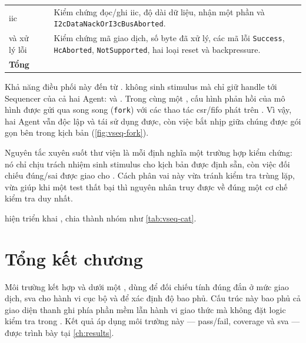 \begin{table}[!htbp]
\begin{tabular}{L{3.0cm} C{1.6cm} L{8.5cm}}
		\gls{iic}                          & \IicVseqCount{}               & Kiểm chứng đọc/ghi \gls{iic}, độ dài dữ liệu, nhận một phần và \texttt{I2cDataNackOr\allowbreak I3cBusAborted}.                                              \\
		\ResponseDescriptor{} và xử lý lỗi & \ResponseVseqCount{}          & Kiểm chứng mã giao dịch, số byte đã xử lý, các mã lỗi \texttt{Success}, \texttt{HcAborted}, \texttt{NotSupported}, hai loại reset và backpressure.         \\
		\midrule
		\textbf{Tổng}                      & \textbf{\RunnableVseqCount{}}                                                                                                                                                                \\
		\bottomrule
	\end{tabular}
\end{table}

Khả năng điều phối này đến từ \VirtualSequencer{}. \VirtualSequencer{} không sinh stimulus mà
chỉ giữ handle tới Sequencer của cả hai Agent: \RegisterAgent{} và \IThreeCAgent{}. Trong cùng
một \VirtualSequence{}, cấu hình phản hồi của mô hình \Target{} được gửi qua
\IThreeCSequencer{} song song (\texttt{fork}) với các thao tác \gls{csr}/\gls{fifo} phát trên
\RegisterSequencer{}. Vì vậy, hai Agent vẫn độc lập và tái sử dụng được, còn việc bắt nhịp giữa chúng được gói gọn bên trong kịch bản (\cref{fig:vseq-fork}).

Nguyên tắc xuyên suốt thư viện là mỗi \VirtualSequence{} định nghĩa một trường hợp kiểm chứng:
nó chỉ chịu trách nhiệm sinh stimulus cho kịch bản được định sẵn, còn việc đối chiếu đúng/sai được
giao cho \Scoreboard{}. Cách phân vai này vừa tránh kiểm tra trùng lặp, vừa giúp khi một test thất
bại thì nguyên nhân truy được về đúng một cơ chế kiểm tra duy nhất.

\Testbench{} hiện triển khai \RunnableVseqCount{} \VirtualSequence{}, chia thành
\VseqCategoryCount{} nhóm như \cref{tab:vseq-cat}.

\section{Tổng kết chương}
\label{sec:ver-summary}

Môi trường kết hợp \RegisterAgent{} và \IThreeCAgent{} dưới một \VirtualSequencer{}, dùng
\Scoreboard{} để đối chiếu tính đúng đắn ở mức giao dịch, \gls{sva} cho hành vi cục bộ và \FunctionalCoverage{}
để xác định độ bao phủ. Cấu trúc này bao phủ cả giao diện thanh ghi phía phần mềm lẫn hành
vi giao thức mà không đặt logic kiểm tra trong \VirtualSequence{}. Kết quả áp dụng môi trường
này --- pass/fail, coverage và \gls{sva} --- được trình bày tại \cref{ch:results}.
